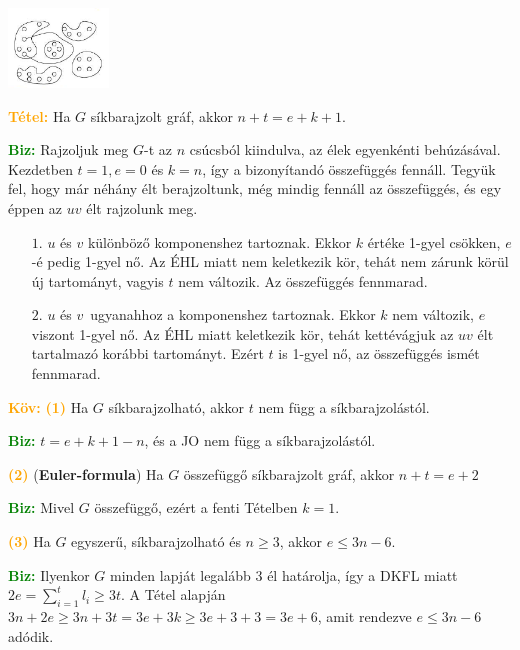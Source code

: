 \documentclass[../../szobeli.tex]{subfiles}
\begin{document}
\begin{itemize}
        \includegraphics[width=0.2\textwidth]{./img/1.png}

        \textcolor{orange}{\textbf{Tétel:}} Ha $G$ síkbarajzolt gráf, akkor $n+t=e+k+1$. 

        \textcolor{green}{\textbf{Biz:}} Rajzoljuk meg $G$-t az $n$ csúcsból kiindulva, az élek egyenkénti behúzásával. Kezdetben $t=1, e=0$ és $k=n$, így a bizonyítandó összefüggés fennáll. Tegyük fel, hogy már néhány élt berajzoltunk, még mindig fennáll az összefüggés, és egy éppen az $uv$ élt rajzolunk meg. \begin{itemize}
            \item[$\boxed{1.}$] $u$ és $v$ különböző komponenshez tartoznak. Ekkor $k$ értéke 1-gyel csökken, $e$-é pedig 1-gyel nő. Az ÉHL miatt nem keletkezik kör, tehát nem zárunk körül új tartományt, vagyis $t$ nem változik. Az összefüggés fennmarad.
            \item[$\boxed{2.}$] $u$ és $v$ ugyanahhoz a komponenshez tartoznak. Ekkor $k$ nem változik, $e$ viszont 1-gyel nő. Az ÉHL miatt keletkezik kör, tehát kettévágjuk az $uv$ élt tartalmazó korábbi tartományt. Ezért $t$ is 1-gyel nő, az összefüggés ismét fennmarad. 
        \end{itemize}

        \textcolor{orange}{\textbf{Köv:}} \textcolor{orange}{\textbf{(1)}} Ha $G$ síkbarajzolható, akkor $t$ nem függ a síkbarajzolástól.

        \textcolor{green}{\textbf{Biz:}} $t = e + k + 1 - n$, és a JO nem függ a síkbarajzolástól. 

        \textcolor{orange}{\textbf{(2)}} (\textbf{Euler-formula}) Ha $G$ összefüggő síkbarajzolt gráf, akkor $n + t = e + 2$

        \textcolor{green}{\textbf{Biz:}} Mivel $G$ összefüggő, ezért a fenti Tételben $k = 1$. 

        \textcolor{orange}{\textbf{(3)}} Ha $G$ egyszerű, síkbarajzolható és $n \geq 3$, akkor $e \leq 3n - 6$.

        \textcolor{green}{\textbf{Biz:}} Ilyenkor $G$ minden lapját legalább 3 él határolja, így a DKFL miatt $2e = \sum_{i=1}^{t} l_i \geq 3t$. A Tétel alapján $3n + 2e \geq 3n + 3t = 3e + 3k \geq 3e + 3 + 3 = 3e + 6$, amit rendezve $e \leq 3n - 6$ adódik. 


\end{itemize}
\end{document}
